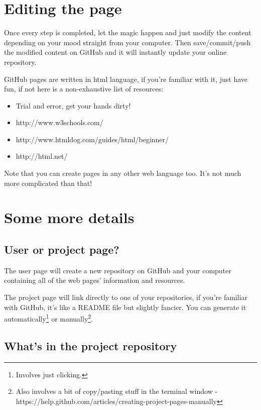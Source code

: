 \documentclass[a4paper,11pt]{article}
\begin{document}
\section{Editing the page}
\setlength{\parindent}{5ex}
Once every step is completed, let the magic happen and just modify the content depending on your mood straight from your computer. Then save/commit/push the modified content on GitHub and it will instantly update your online repository.

GitHub pages are written in html language, if you're familiar with it, just have fun, if not here is a non-exhaustive list of resources:
\par
\begin{itemize}
    \item{Trial and error, get your hands dirty!}
    \item{http://www.w3schools.com/}
    \item{http://www.htmldog.com/guides/html/beginner/}
    \item{http://html.net/}
\end{itemize}
Note that you can create pages in any other web language too.
It's not much more complicated than that!

\newpage

\section{Some more details}
\subsection{User or project page?}
\setlength{\parindent}{5ex}
The user page will create a new repository on GitHub and your computer containing all of the web pages' information and resources.

The project page will link directly to one of your repositories, if you're familiar with GitHub, it's like a README file but slightly fancier.
You can generate it automatically\footnote{Involves just clicking.} or manually\footnote{Also involves a bit of copy/pasting stuff in the terminal window - https://help.github.com/articles/creating-project-pages-manually
}.
\par

\subsection{What's in the project repository}
\end{document}
